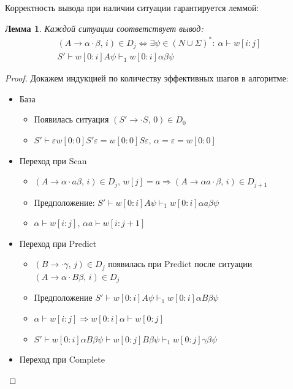 \documentclass[a4paper,12pt]{article}
\theoremstyle{plain}
\newtheorem{lemma}{Лемма}[subsection]
\theoremstyle{definition}
\theoremstyle{remark}
\begin{document}
Корректность вывода при наличии ситуации гарантируется леммой:
\begin{lemma}
	Каждой ситуации соответствует вывод:
	\begin{align*}
		(A \to \alpha\cdot\beta,\, i) \in D_j \Leftrightarrow \exists \psi \in (N \cup \Sigma)^* :\: \alpha \vdash w[i : j] \\
		S' \vdash w[0:i]A\psi \vdash_1 w[0:i]\alpha\beta\psi
	\end{align*}
\end{lemma}

\begin{proof}
	Докажем индукцией по количеству эффективных шагов в алгоритме:
	\begin{itemize}
		\item База
		      \begin{itemize}
			      \item Появилась ситуация $(S' \to \cdot S,\, 0) \in D_0$
			      \item $S' \vdash \varepsilon w[0 : 0]S' \varepsilon = w[0:0]S\varepsilon,\, \alpha = \varepsilon = w[0 : 0]$
		      \end{itemize}
		\item Переход при Scan
		      \begin{itemize}
			      \item $(A \to \alpha\cdot a \beta,\, i) \in D_j,\, w[j] = a \Rightarrow (A \to \alpha a \cdot \beta,\, i) \in D_{j + 1}$
			      \item Предположение: $S' \vdash w[0:i]A\psi \vdash_1 w[0:i]\alpha a \beta\psi$
			      \item $\alpha \vdash w[i : j],\, \alpha a \vdash w[i : j + 1]$
		      \end{itemize}
		\item Переход при Predict
		      \begin{itemize}
			      \item $(B \to \cdot\gamma,\, j) \in D_j$ появилась при Predict после ситуации $(A \to \alpha\cdot B \beta,\, i) \in D_j$
			      \item Предположение $S' \vdash w[0:i]A\psi \vdash_1 w[0:i]\alpha B \beta\psi$
			      \item $\alpha \vdash w[i:j] \Rightarrow w[0:i]\alpha \vdash w[0:j]$
			      \item $S' \vdash w[0:i]\alpha B\beta\psi \vdash w[0:j]B\beta\psi \vdash_1 w[0:j]\gamma\beta\psi$
		      \end{itemize}
		\item Переход при Complete

\end{itemize}
\end{proof}
\end{document}
